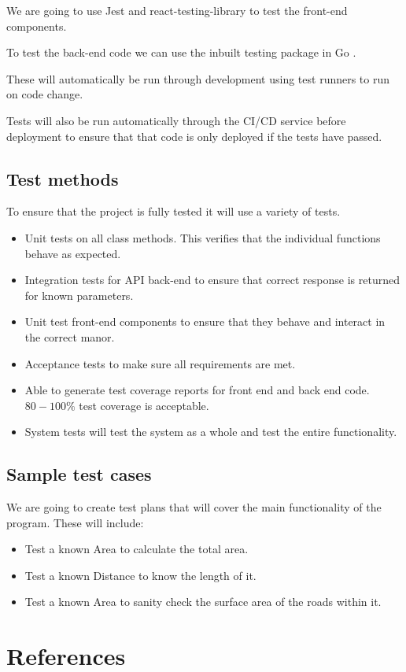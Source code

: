 \documentclass[a4paper,11pt]{article}
\begin{document}
We are going to use Jest \autocite{jest:11} and react-testing-library
\autocite{rtl:12} to test the front-end components.

To test the back-end code we can use the inbuilt testing package in Go
\autocite{go:13}.

These will automatically be run through development using test runners to run on
code change.

Tests will also be run automatically through the CI/CD service before deployment
to ensure that that code is only deployed if the tests have passed.

\subsection{Test methods}

To ensure that the project is fully tested it will use a variety of tests.

\begin{itemize}
  \item Unit tests on all class methods. This verifies that the individual
    functions behave as expected.
  \item Integration tests for API back-end to ensure that correct response is
    returned for known parameters.
  \item Unit test front-end components to ensure that they behave and interact
    in the correct manor.
  \item Acceptance tests to make sure all requirements are met.
  \item Able to generate test coverage reports for front end and back end code.
    $80-100\%$ test coverage is acceptable.
  \item System tests will test the system as a whole and test the entire
    functionality.
\end{itemize}

\subsection{Sample test cases}

We are going to create test plans that will cover the main functionality of the
program. These will include:

\begin{itemize}
  \item Test a known Area to calculate the total area.
  \item Test a known Distance to know the length of it.
  \item Test a known Area to sanity check the surface area of the roads within
    it.
\end{itemize}

\pagebreak

\section{References}

\printbibliography{}
\end{document}
